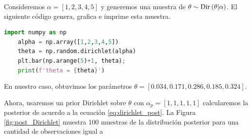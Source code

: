 \begin{example}
	Consideremos $\alpha = [1,2,3,4,5]$ y generemos una muestra de $\theta\sim\text{Dir}\left(\theta|\alpha\right)$. El siguiente código genera, grafica e imprime esta muestra. 
	\begin{lstlisting}[language=Python]
	import numpy as np
	alpha = np.array([1,2,3,4,5]) 
	theta = np.random.dirichlet(alpha)
	plt.bar(np.arange(5)+1, theta);
	print(f'theta = {theta}')
\end{lstlisting}
En nuestro caso, obtuvimos los parámetros $ \theta = [0.034, 0.171, 0.286, 0.185, 0.324]$.

 Ahora, usaremos un prior Dirichlet sobre $\theta$ con $\alpha_p = [1,1,1,1,1]$ calcularemos la posterior de acuerdo a la ecuación \ref{eq:dirichlet_post}. La Figura \ref{fig:post_Dirichlet} muestra 100 muestras de la distribución posterior para una cantidad de observaciones igual a 


\end{example}
